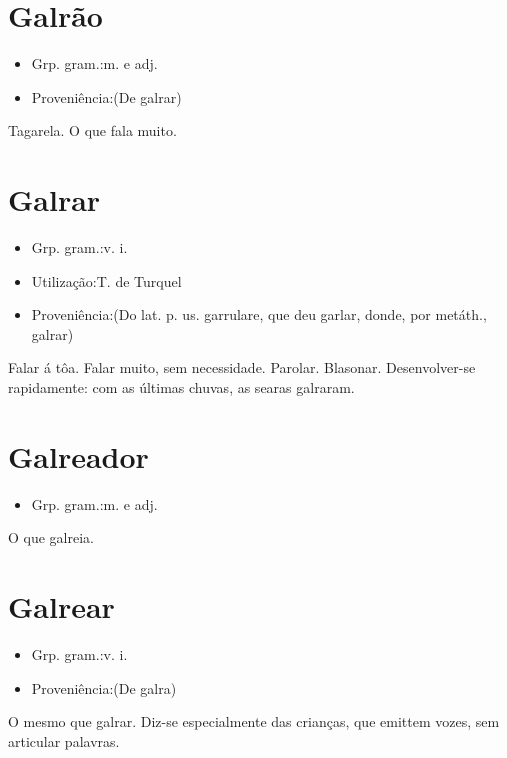 \section{Galrão}
\begin{itemize}
\item {Grp. gram.:m.  e  adj.}
\end{itemize}
\begin{itemize}
\item {Proveniência:(De \textunderscore galrar\textunderscore )}
\end{itemize}
Tagarela.
O que fala muito.
\section{Galrar}
\begin{itemize}
\item {Grp. gram.:v. i.}
\end{itemize}
\begin{itemize}
\item {Utilização:T. de Turquel}
\end{itemize}
\begin{itemize}
\item {Proveniência:(Do lat. p. us. \textunderscore garrulare\textunderscore , que deu \textunderscore garlar\textunderscore , donde, por metáth., \textunderscore galrar\textunderscore )}
\end{itemize}
Falar á tôa.
Falar muito, sem necessidade.
Parolar.
Blasonar.
Desenvolver-se rapidamente: \textunderscore com as últimas chuvas, as searas galraram\textunderscore .
\section{Galreador}
\begin{itemize}
\item {Grp. gram.:m.  e  adj.}
\end{itemize}
O que galreia.
\section{Galrear}
\begin{itemize}
\item {Grp. gram.:v. i.}
\end{itemize}
\begin{itemize}
\item {Proveniência:(De \textunderscore galra\textunderscore )}
\end{itemize}
O mesmo que \textunderscore galrar\textunderscore .
Diz-se especialmente das crianças, que emittem vozes, sem articular palavras.
